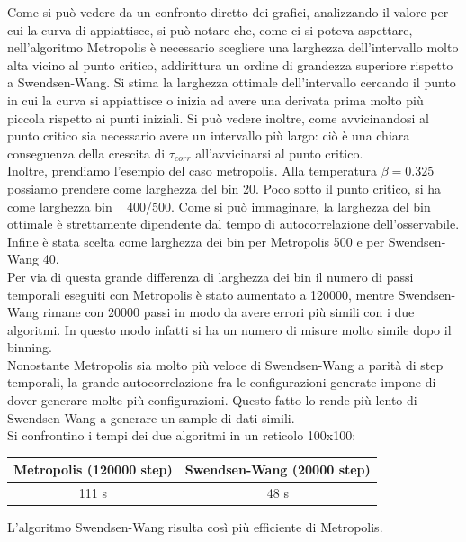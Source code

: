 Come si può vedere da un confronto diretto dei grafici, analizzando il valore per cui la curva di appiattisce, si può notare che, come ci si poteva aspettare, nell'algoritmo Metropolis è necessario scegliere una larghezza dell'intervallo molto alta vicino al punto critico, addirittura un ordine di grandezza superiore rispetto a Swendsen-Wang.
Si stima la larghezza ottimale dell'intervallo cercando il punto in cui la curva si appiattisce o inizia ad avere una derivata prima molto più piccola rispetto ai punti iniziali.
Si può vedere inoltre, come avvicinandosi al punto critico sia necessario avere un intervallo più largo: ciò è una chiara conseguenza della crescita di $\tau_{corr}$ all'avvicinarsi al punto critico.\\
Inoltre, prendiamo l'esempio del caso metropolis. Alla temperatura $\beta = 0.325$ possiamo prendere come larghezza del bin 20. Poco sotto il punto critico, si ha come larghezza bin ~ 400/500.
Come si può immaginare, la larghezza del bin ottimale è strettamente dipendente dal tempo di autocorrelazione dell'osservabile.
Infine è stata scelta come larghezza dei bin per Metropolis 500 e per Swendsen-Wang 40.\\
Per via di questa grande differenza di larghezza dei bin il numero di passi temporali eseguiti con Metropolis è stato aumentato a 120000, mentre Swendsen-Wang rimane con 20000 passi in modo da avere errori più simili con i due algoritmi. In questo modo infatti si ha un numero di misure molto simile dopo il binning.\\
Nonostante Metropolis sia molto più veloce di Swendsen-Wang a parità di step temporali, la grande autocorrelazione fra le configurazioni generate impone di dover generare molte più configurazioni. Questo fatto lo rende più lento di Swendsen-Wang a generare un sample di dati simili.\\
Si confrontino i tempi dei due algoritmi in un reticolo 100x100:
\\
\begin{center}
\begin{tabular}{cc}
\toprule
	Metropolis (120000 step) & Swendsen-Wang (20000 step) \\
\midrule
	111 s & 48 s \\
\bottomrule
\end{tabular} 
\end{center}

L'algoritmo Swendsen-Wang risulta così più efficiente di Metropolis.
\newpage

